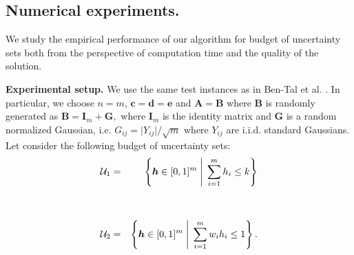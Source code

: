\documentclass[moor]{informs1}              %
\newcommand{\mb}[1]{\ensuremath{\boldsymbol{#1}}}
\begin{document}
%
%

\subsection{Numerical experiments.}

We study the empirical performance of our algorithm for budget of uncertainty sets both from the perspective of computation time and the quality of the solution. 

\vspace{2mm}
\noindent
{\bf Experimental setup.}
We use the same test instances as in Ben-Tal et al. \cite{ben2018tractable}. In particular, we choose $n=m$, $\mb c= \mb d = \mb e $ and $ \mb A= \mb B$ where $\mb B$ is  randomly generated as $ \mb B = \mb I_m + \mb G,$ where $\mb I_m$ is the identity matrix and $\mb G$ is a random normalized Gaussian, i.e. $G_{ij} = \vert Y_{ij} \vert / \sqrt{m}$ where $Y_{ij}$ are i.i.d. standard Gaussians.
 Let consider  the following budget of uncertainty sets:
\begin{eqnarray}
\label{set:k-ones:num} {\cal U}_1 & = & \left\{ \mb h \in [0,1]^{m} \;  \Bigg\vert \; \sum_{i=1}^m h_i \leq k \right\} \\
\nonumber & \\
\nonumber & \\
\label{set:budget:num}  {\cal U}_2 & = & \left\{ \mb h \in [0,1]^{m} \;  \Bigg\vert \; \sum_{i=1}^m w_i h_i \leq 1 \right\}.
\end{eqnarray}
\end{document}
